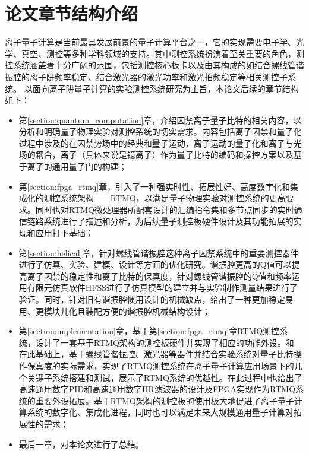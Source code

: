 \section[论文章节结构介绍]{论文章节结构介绍}
离子量子计算是当前最具发展前景的量子计算平台之一，它的实现需要电子学、光学、真空、测控等多种学科领域的支持。其中测控系统扮演着至关重要的角色，测控系统涵盖着十分广阔的范围，包括测控核心板卡以及由其构成的如结合螺线管谐振腔的离子阱频率稳定、结合激光器的激光功率和激光拍频稳定等相关测控子系统。
以面向离子阱量子计算的实验测控系统研究为主旨，本论文后续的章节结构如下：
\begin{itemize}
    \item 第\ref{section:quantum_computation}章，介绍囚禁离子量子比特的相关内容，以分析和明确量子物理实验对测控系统的切实需求。内容包括离子囚禁和量子化过程中涉及的在囚禁势场中的经典和量子运动，离子运动的量子化和离子与光场的耦合，离子（具体来说是镱离子）作为量子比特的编码和操控方案以及基于离子的通用量子门的构建；
    \item 第\ref{section:fpga_rtmq}章，引入了一种强实时性、拓展性好、高度数字化和集成化的测控系统架构——RTMQ，以满足量子物理实验对测控系统的更高要求。同时也对RTMQ微处理器所配套设计的汇编指令集和多节点同步的实时通信链路系统进行了描述和分析，为后续量子测控板硬件设计及其功能拓展的实现和应用打下基础；
    \item 第\ref{section:helical}章，针对螺线管谐振腔这种离子囚禁系统中的重要测控器件进行了仿真、实验、建模、设计等方面的优化研究。谐振腔更高的Q值可以提高离子囚禁的稳定性和离子比特的保真度，针对螺线管谐振腔的Q值和频率运用有限元仿真软件HFSS进行了仿真模型的建立并与实验制作测量结果进行了验证。同时，针对旧有谐振腔惯用设计的机械缺点，给出了一种更加稳定易用、更模块儿化且装配方便的谐振腔机械结构设计；
    \item 第\ref{section:implementation}章，基于第\ref{section:fpga_rtmq}章RTMQ测控系统，设计了一套基于RTMQ架构的测控板硬件并实现了相应的功能外设。和
    在此基础上，基于螺线管谐振腔、激光器等器件并结合实验系统对量子比特操作保真度的实际需求，实现了RTMQ测控系统在离子量子计算应用场景下的几个关键子系统搭建和测试，展示了RTMQ系统的优越性。在此过程中也给出了高速通用数字PID和高速通用数字IIR滤波器的设计及FPGA实现作为RTMQ系统的重要外设拓展。基于RTMQ架构的测控板的使用极大地促进了离子量子计算系统的数字化、集成化进程，同时也可以满足未来大规模通用量子计算对拓展性的需求；
    \item 最后一章，对本论文进行了总结。
\end{itemize}